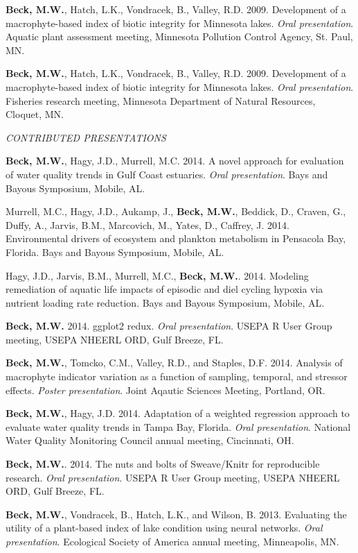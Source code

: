 \documentclass[letterpaper,12pt]{article}
\begin{document}
{\bf Beck, M.W.}, Hatch, L.K., Vondracek, B., Valley, R.D. 2009. Development of a macrophyte-based index of biotic integrity for Minnesota lakes. \textit{Oral presentation}. Aquatic plant assessment meeting, Minnesota Pollution Control Agency, St. Paul, MN.

{\bf Beck, M.W.}, Hatch, L.K., Vondracek, B., Valley, R.D. 2009. Development of a macrophyte-based index of biotic integrity for Minnesota lakes. \textit{Oral presentation}. Fisheries research meeting, Minnesota Department of Natural Resources, Cloquet, MN.

\vspace{\baselineskip} 
\centerline{\large{\textit{CONTRIBUTED PRESENTATIONS}}}

{\bf Beck, M.W.}, Hagy, J.D., Murrell, M.C. 2014. A novel approach for evaluation of water quality trends in Gulf Coast estuaries. \textit{Oral presentation}. Bays and Bayous Symposium, Mobile, AL.

Murrell, M.C., Hagy, J.D., Aukamp, J., {\bf Beck, M.W.}, Beddick, D., Craven, G., Duffy, A., Jarvis, B.M., Marcovich, M., Yates, D., Caffrey, J. 2014. Environmental drivers of ecosystem and plankton metabolism in Pensacola Bay, Florida. Bays and Bayous Symposium, Mobile, AL. 

Hagy, J.D., Jarvis, B.M., Murrell, M.C., {\bf Beck, M.W.}. 2014. Modeling remediation of aquatic life impacts of episodic and diel cycling hypoxia via nutrient loading rate reduction. Bays and Bayous Symposium, Mobile, AL. 

{\bf Beck, M.W.} 2014. ggplot2 redux. \textit{Oral presentation}. USEPA R User Group meeting, USEPA NHEERL ORD, Gulf Breeze, FL.

{\bf Beck, M.W.}, Tomcko, C.M., Valley, R.D., and Staples, D.F. 2014. Analysis of macrophyte indicator variation as a function of sampling, temporal, and stressor effects. \textit{Poster presentation}. Joint Aqautic Sciences Meeting, Portland, OR.

{\bf Beck, M.W.}, Hagy, J.D. 2014. Adaptation of a weighted regression approach to evaluate water quality trends in {T}ampa {B}ay, {F}lorida. \textit{Oral presentation}. National Water Quality Monitoring Council annual meeting, Cincinnati, OH.

{\bf Beck, M.W.}. 2014. The nuts and bolts of Sweave/Knitr for reproducible research. \textit{Oral presentation}. USEPA R User Group meeting, USEPA NHEERL ORD, Gulf Breeze, FL.

{\bf Beck, M.W.}, Vondracek, B., Hatch, L.K., and Wilson, B. 2013. Evaluating the utility of a plant-based index of lake condition using neural networks. \textit{Oral presentation}. Ecological Society of America annual meeting, Minneapolis, MN.
\end{document}
